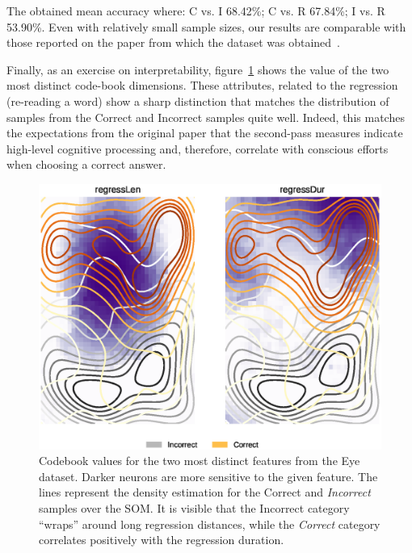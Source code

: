 The obtained mean accuracy where: C vs. I 68.42\%; C vs. R 67.84\%; I vs. R 53.90\%.
Even with relatively small sample sizes, our results are comparable with those
reported on the paper from which the dataset was obtained~\cite{salojarvi2005inferring}.

Finally, as an exercise on interpretability, figure~\ref{fig:eye_distinct_features}
shows the value of the two most distinct code-book dimensions. These attributes,
related to the regression (re-reading a word) show a sharp distinction that
matches the distribution of samples from the Correct and Incorrect samples quite
well.
Indeed, this matches the expectations from the original paper that the second-pass
measures indicate high-level cognitive processing and, therefore, correlate with
conscious efforts when choosing a correct answer.

\begin{figure}[htb]
    \centering
    \includegraphics[width=\textwidth]{images/6_som/eye_regress.eps}
    \caption[Codebook values for the two most distinct features from the Eye dataset.]{
        Codebook values for the two most distinct features from the Eye dataset.
        Darker neurons are more sensitive to the given feature.
        The lines represent the density estimation for the Correct and \emph{Incorrect} samples
        over the \gls{SOM}.
        It is visible that the Incorrect category ``wraps'' around long regression distances, while the
        \emph{Correct} category correlates positively with the regression duration.
    }
    \label{fig:eye_distinct_features}
\end{figure}



